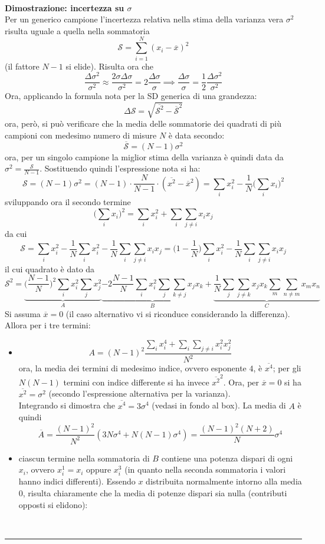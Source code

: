 \documentclass[10pt, oneside]{book}
\newcommand{\infobox}[2]{\vspace{0.5cm}~\\ \textbf{#1} \hrulefill \vspace{0.2cm}\\#2 {}\,\\\hrule \vspace{0.5cm}}
\begin{document}
\infobox{Dimostrazione: incertezza su $\sigma$}{
Per un generico campione l'incertezza relativa nella stima della varianza vera $\sigma^2$ risulta uguale a quella nella sommatoria
\[\mathcal{S} = \sum\limits_{i=1}^{N} (x_i - \overline{x})^2\]
(il fattore $N-1$ si elide). Risulta ora che
\[\frac{\Delta \sigma^2}{\sigma^2} \approx \frac{2 \sigma \Delta \sigma}{\sigma^2} = 2 \frac{\Delta \sigma}{\sigma} \implies \frac{\Delta \sigma}{\sigma} = \frac{1}{2} \frac{\Delta \sigma^2}{\sigma^2}\]
Ora, applicando la formula nota per la SD generica di una grandezza:
\[\Delta \mathcal{S} = \sqrt{\overline{\mathcal{S}^2} - \overline{\mathcal{S}}^2}\]
ora, però, si può verificare che la media delle sommatorie dei quadrati di più campioni con medesimo numero di misure $N$ è data secondo:
\[\overline{\mathcal{S}} = (N-1) \sigma^2\]
ora, per un singolo campione la miglior stima della varianza è quindi data da $\displaystyle \sigma^2 = \frac{\mathcal{S}}{N-1}$. Sostituendo quindi l'espressione nota si ha:
\[\mathcal{S} = (N-1) \sigma^2 = (N-1) \cdot \frac{N}{N-1} \cdot (\overline{x^2} - \overline{x}^2) = \sum_i x_i^2 - \frac{1}{N} \bigg(\sum_i x_i\bigg)^2\]
sviluppando ora il secondo termine
\[\bigg(\sum_i x_i\bigg)^2 = \sum_i x_i^2 + \sum_i \sum_{j \neq i} x_i x_j\]
da cui
\[\mathcal{S} = \sum_i x_i^2 - \frac{1}{N} \sum_i x_i^2 - \frac{1}{N} \sum_i \sum_{j \neq i} x_i x_j = \bigg(1 - \frac{1}{N}\bigg) \sum_i x_i^2 - \frac{1}{N} \sum_i \sum_{j \neq i} x_i x_j\]
il cui quadrato è dato da
\[\mathcal{S}^2 = \underbrace{\bigg(\frac{N-1}{N}\bigg)^{2} \sum_i x_i^2 \sum_j x_j^2}_{A} \underbrace{-2 \frac{N-1}{N} \sum_i x_i^2 \sum_j \sum_{k \neq j} x_j x_k}_{B} + \underbrace{\frac{1}{N} \sum_j \sum_{j \neq k} x_j x_k \sum_m \sum_{n \neq m} x_m x_n}_{C}\]
Si assuma $\overline{x} = 0$ (il caso alternativo vi si riconduce considerando la differenza). Allora per i tre termini:
\begin{itemize}
\item \[A = (N-1)^2 \frac{\sum_i x_i^4 + \sum_i \sum_{j \neq i} x_i^2 x_j^2}{N^2}\]
ora, la media dei termini di medesimo indice, ovvero esponente $4$, è $\overline{x^4}$; per gli $N(N-1)$ termini con indice differente si ha invece $\overline{x^2}^2$. Ora, per $\overline{x} = 0$ si ha $\overline{x^2} = \sigma^2$ (secondo l'espressione alternativa per la varianza).\\
Integrando si dimostra che $\overline{x^4} = 3 \sigma^4$ (vedasi in fondo al box). La media di $A$ è quindi
\[\overline{A} = \frac{(N-1)^2}{N^2} (3 N \sigma^4 + N (N-1) \sigma^4) = \frac{(N-1)^2 (N+2)}{N} \sigma^4\]
\item ciascun termine nella sommatoria di $B$ contiene una potenza dispari di ogni $x_i$, ovvero $x_i^1 = x_i$ oppure $x_i^3$ (in quanto nella seconda sommatoria i valori hanno indici differenti). Essendo $x$ distribuita normalmente intorno alla media $0$, risulta chiaramente che la media di potenze dispari sia nulla (contributi opposti si elidono):

\end{itemize}}
\end{document}

